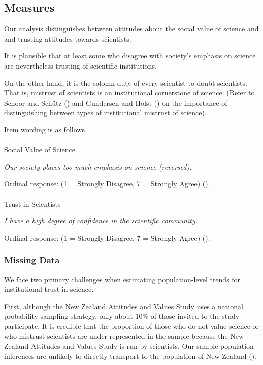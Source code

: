 \documentclass[
  single column]{article}
\makeatletter
\let\oldparagraph\paragraph
\renewcommand{\paragraph}{
    \@ifstar
      \xxxParagraphStar
      \xxxParagraphNoStar
  }
\newcommand{\xxxParagraphStar}[1]{\oldparagraph*{#1}\mbox{}}
\newcommand{\xxxParagraphNoStar}[1]{\oldparagraph{#1}\mbox{}}
\makeatother
\begin{document}
\subsection{Measures}\label{measures}

Our analysis distinguishes between attitudes about the social value of
science and and trusting attitudes towards scientists.

It is plausible that at least some who disagree with society's emphasis
on science are nevertheless trusting of scientific institutions.

On the other hand, it is the solomn duty of every scientist to doubt
scientists. That is, mistrust of scientists is an institutional
cornerstone of science. (Refer to Schoor and Schütz
() and Gundersen and Holst
() on the importance of
distinguishing between types of institutional mistrust of science).

Item wording is as follows.

\paragraph{Social Value of Science}\label{social-value-of-science}

\emph{Our society places too much emphasis on science (reversed).}

Ordinal response: (1 = Strongly Disagree, 7 = Strongly Agree)
().

\paragraph{Trust in Scientists}\label{trust-in-scientists}

\emph{I have a high degree of confidence in the scientific community.}

Ordinal response: (1 = Strongly Disagree, 7 = Strongly Agree)
().

\subsubsection{Missing Data}\label{missing-data}

We face two primary challenges when estimating population-level trends
for institutional trust in science.

First, although the New Zealand Attitudes and Values Study uses a
national probability sampling strategy, only about 10\% of those invited
to the study participate. It is credible that the proportion of those
who do not value science or who mistrust scientists are
under-represented in the sample because the New Zealand Attitudes and
Values Study is run by scientists. Our sample population inferences are
unlikely to directly transport to the population of New Zealand
().
\end{document}
